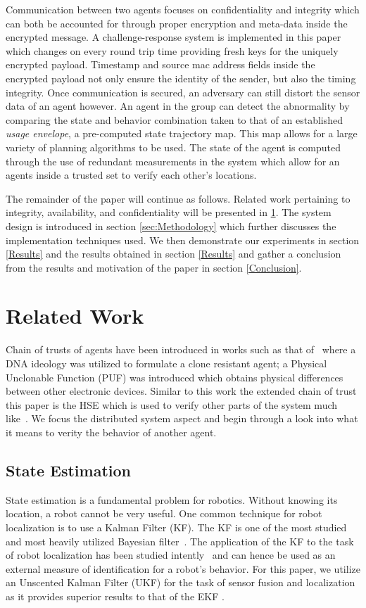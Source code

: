 \documentclass[conference]{IEEEtran}
\begin{document}
Communication between two agents focuses on confidentiality and integrity which can both be accounted for through proper encryption and meta-data inside the encrypted message. A challenge-response system is implemented in this paper which changes on every round trip time providing fresh keys for the uniquely encrypted payload. Timestamp and source mac address fields inside the encrypted payload not only ensure the identity of the sender, but also the timing integrity. Once communication is secured, an adversary can still distort the sensor data of an agent however. An agent in the group can detect the abnormality by comparing the state and behavior combination taken to that of an established \textit{usage envelope}, a pre-computed state trajectory map. This map allows for a large variety of planning algorithms to be used. The state of the agent is computed through the use of redundant measurements in the system which allow for an agents inside a trusted set to verify each other's locations.

The remainder of the paper will continue as follows. Related work pertaining to integrity, availability, and confidentiality will be presented in \ref{sec:Related Work}. The system design is introduced in section \ref{sec:Methodology} which further discusses the implementation techniques used. We then demonstrate our experiments in section \ref{Results} and the results obtained in section \ref{Results} and gather a conclusion from the results and motivation of the paper in section \ref{Conclusion}.

\section{Related Work} \label{sec:Related Work}
Chain of trusts of agents have been introduced in works such as that of~\textcite{adi2009mechatronic} where a DNA ideology was utilized to formulate a clone resistant agent; a Physical Unclonable Function (PUF) was introduced which obtains physical differences between other electronic devices. Similar to this work the extended chain of trust this paper is the HSE which is used to verify other parts of the system much like~\textcite{adi2009mechatronic}. We focus the distributed system aspect and begin through a look into what it means to verity the behavior of another agent.

\subsection{State Estimation}
State estimation is a fundamental problem for robotics. Without knowing its location, a robot cannot be very useful. One common technique for robot localization is to use a Kalman Filter (KF). The KF is one of the most studied and most heavily utilized Bayesian filter~\cite[39-81]{ProbabilisticRobotics}. The application of the KF to the task of robot localization has been studied intently~\cite{Localization2003, Mohsin2014} and can hence be used as an external measure of identification for a robot's behavior. For this paper, we utilize an Unscented Kalman Filter (UKF) for the task of sensor fusion and localization as it provides superior results to that of the EKF \cite{Thrun2002Probabilistic}.
\end{document}
